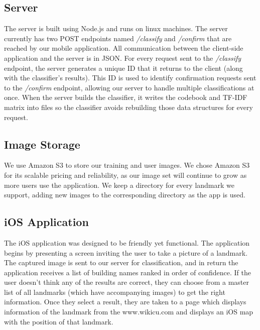 \subsection{Server}
The server is built using Node.js and runs on linux machines. The server currently has two POST endpoints named \textit{/classify} and \textit{/confirm} that are reached by our mobile application. All communication between the client-side application and the server is in JSON. For every request sent to the \textit{/classify} endpoint, the server generates a unique ID that it returns to the client (along with the classifier's results). This ID is used to identify confirmation requests sent to the \textit{/confirm} endpoint, allowing our server to handle multiple classifications at once. When the server builds the classifier, it writes the codebook and TF-IDF matrix into files so the classifier avoids rebuilding those data structures for every request.

\subsection{Image Storage}
We use Amazon S3 to store our training and user images. We chose Amazon S3 for its scalable pricing and reliability, as our image set will continue to grow as more users use the application. We keep a directory for every landmark we support, adding new images to the corresponding directory as the app is used. 

\subsection{iOS Application}
The iOS application was designed to be friendly yet functional. The application begins by presenting a screen inviting the user to take a picture of a landmark. The captured image is sent to our server for classification, and in return the application receives a list of building names ranked in order of confidence. If the user doesn't think any of the results are correct, they can choose from a master list of all landmarks (which have accompanying images) to get the right information. Once they select a result, they are taken to a page which displays information of the landmark from the www.wikicu.com and displays an iOS map with the position of that landmark.